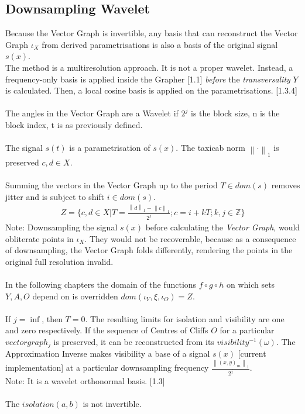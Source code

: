 \documentclass{report}
\newcommand\norm[1]{\left\lVert#1\right\rVert}
\begin{document}
\subsection{Downsampling Wavelet}
Because the Vector Graph is invertible, any basis that can reconstruct the Vector Graph $\iota_{X}$ from derived parametrisations is also a basis of the original signal $s(x)$.\\
The method is a multiresolution approach. It is not a proper wavelet. Instead, a frequency-only basis is applied inside the Grapher \cite{Grapher}[1.1] \emph{before} the \emph{transversality} $Y$ is calculated. Then, a local cosine basis is applied on the parametrisations. \cite{Mallat}[1.3.4]\\\\
The angles in the Vector Graph are a Wavelet if $2^j$ is the block size, n is the block index, t is as previously defined.\\\\
The signal $s(t)$ is a parametrisation of $s(x)$. The taxicab norm $\norm{\cdot}_{1}$ is preserved $c,d \in X$.\\\\
Summing the vectors in the Vector Graph up to the period $T \in dom(s)$ removes jitter and is subject to shift $i \in dom(s)$.
\begin{align}
Z = \{c,d \in X \vert T=\frac{\norm{d}_1-\norm{c}_1}{2^j};c=i+kT;k,j \in \mathbb{Z}\}
\end{align}
Note: Downsampling the signal $s(x)$ before calculating the \emph{Vector Graph}, would obliterate points in $\iota_{X}$. They would not be recoverable, because as a consequence of downsampling, the Vector Graph folds differently, rendering the points in the original full resolution invalid.\\\\
In the following chapters the domain of the functions $f \circ g \circ h$ on which sets $Y,A,O$ depend on is overridden $dom(\iota_{Y},\xi,\iota_{O})=Z$.\\\\
If $j=\inf$, then $T=0$. The resulting limits for isolation and visibility are one and zero respectively.
If the sequence of Centres of Cliffs $O$ for a particular $vectorgraph_{j}$ is preserved, it can be reconstructed from its $visibility^{-1}(\omega)$. The Approximation Inverse makes visibility a base of a signal $s(x)$ \cite{Grapher}[current implementation] at a particular downsampling frequency $\frac{\norm{(x,y)_{m}}_{1}}{2^j}$.\\ Note: It is a wavelet orthonormal basis. \cite{Mallat}[1.3]\\\\
The $isolation(a,b)$ is not invertible.\\\\
\end{document}
